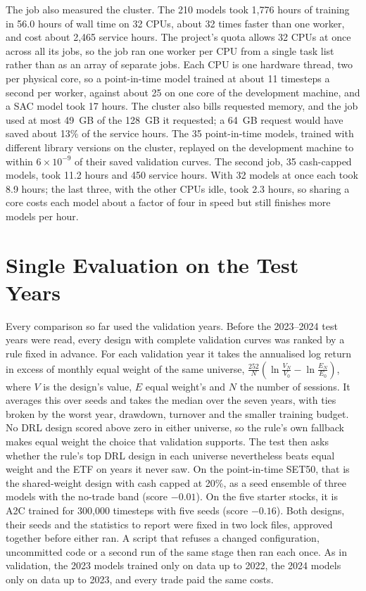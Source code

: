 The job also measured the cluster. The 210 models took 1{,}776 hours of training in 56.0 hours of wall
time on 32 CPUs, about 32 times faster than one worker, and cost about 2{,}465 service hours. The project's
quota allows 32 CPUs at once across all its jobs, so the job ran one worker per CPU from a single task
list rather than as an array of separate jobs. Each CPU is one hardware thread, two per physical core,
so a point-in-time model trained at about 11 timesteps a second per worker, against about 25 on one
core of the development machine, and a SAC model took 17 hours. The cluster also bills requested
memory, and the job used at most 49~GB of the 128~GB it requested; a 64~GB request would have saved
about 13\% of the service hours. The 35 point-in-time
models, trained with different library versions on the cluster, replayed on the development machine to
within $6\times10^{-9}$ of their saved validation curves. The second job, 35 cash-capped models,
took 11.2 hours and 450 service hours. With 32 models at once each took 8.9 hours; the last three, with
the other CPUs idle, took 2.3 hours, so sharing a core costs each model about a factor of four in speed
but still finishes more models per hour.

\section{Single Evaluation on the Test Years}
\label{sec:test}

Every comparison so far used the validation years. Before the 2023--2024 test years were read, every
design with complete validation curves was ranked by a rule fixed in advance. For each validation year
it takes the annualised log return in excess of monthly equal weight of the same universe,
$\frac{252}{N}\left(\ln\frac{V_N}{V_0}-\ln\frac{E_N}{E_0}\right)$, where $V$ is the design's value, $E$
equal weight's and $N$ the number of sessions. It averages this over seeds and takes the median over
the seven years, with ties broken by the worst year, drawdown, turnover and the smaller training budget.
No DRL design scored above zero in either universe, so the rule's own fallback makes equal weight the
choice that validation supports. The test then asks whether the rule's top DRL design in each universe
nevertheless beats equal weight and the ETF on years it never saw. On the point-in-time SET50, that is
the shared-weight design with cash capped at 20\%, as a seed ensemble of three models with the no-trade
band (score $-0.01$). On the five starter stocks, it is A2C trained for 300{,}000 timesteps with five
seeds (score $-0.16$). Both designs, their seeds and the statistics to report were fixed in two lock files,
approved together before either ran. A script that refuses a changed configuration, uncommitted code or
a second run of the same stage then ran each once. As in validation, the 2023 models trained only on data
up to 2022, the 2024 models only on data up to 2023, and every trade paid the same costs.


